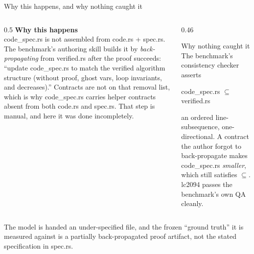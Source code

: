 \documentclass[aspectratio=169,10pt]{beamer}
\newcommand{\code}[1]{{\ttfamily #1}}
\newcommand{\hd}[1]{\textbf{\color{lgTeal}#1}}
\begin{document}
\begin{frame}{Why this happens, and why nothing caught it}

\begin{columns}[T]
\begin{column}{0.5\textwidth}
{\scriptsize
\hd{Why this happens}\\
\code{code\_spec.rs} is not assembled from \code{code.rs} + \code{spec.rs}. The benchmark's
authoring skill builds it by \emph{back-propagating} from \code{verified.rs} after the proof
succeeds: ``update \code{code\_spec.rs} to match the verified algorithm structure (without
proof, ghost vars, loop invariants, and decreases).'' Contracts are not on that removal list,
which is why \code{code\_spec.rs} carries helper contracts absent from both \code{code.rs}
and \code{spec.rs}. That step is manual, and here it was done incompletely.
}
\end{column}

\begin{column}{0.46\textwidth}
\begin{defbox}{Why nothing caught it}
\scriptsize
The benchmark's consistency checker asserts
\begin{center}
\code{code\_spec.rs} $\subseteq$ \code{verified.rs}
\end{center}
an ordered line-subsequence, one-directional. A contract the author forgot to
back-propagate makes \code{code\_spec.rs} \emph{smaller}, which still satisfies $\subseteq$.
\code{lc2094} passes the benchmark's own QA cleanly.
\end{defbox}
\end{column}
\end{columns}

\vspace{10pt}
\begin{callout}[lgRed]
\scriptsize
The model is handed an under-specified file, and the frozen ``ground truth'' it is measured
against is a partially back-propagated proof artifact, not the stated specification in
\code{spec.rs}.
\end{callout}

\end{frame}
\end{document}
